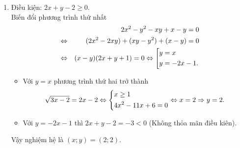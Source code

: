 \begin{ex}
{\begin{enumerate}[1)]
\begin{enumerate}[a)]
\item Xét hai trường hợp
\begin{itemize}
\item Chỉ có đúng một nghiệm lớn hơn 2. Nghĩa là
$$(x_1-2)(x_2-2)<0 \Leftrightarrow x_1x_2-2(x_1+x_2)+4<0 \Leftrightarrow 1<0\quad \text{(Vô lý)}.$$
\item Cả hai nghiệm đều lớn hơn 2. Nghĩa là
$$\heva{& (x_1-2)(x_2-2)>0\\ & x_1+x_2>4} \Leftrightarrow \heva{& 1>0\\ & m+1>4} \Leftrightarrow m>3.$$
\end{itemize}
\end{enumerate}
\item Điều kiện: $2x+y-2\geq 0$.\\
Biến đổi phương trình thứ nhất
\begin{eqnarray*}
&& 2x^2-y^2-xy+x-y=0\\
& \Leftrightarrow & (2x^2-2xy)+(xy-y^2)+(x-y)=0\\
& \Leftrightarrow & (x-y)(2x+y+1)=0\Leftrightarrow \left[\begin{aligned}& y=x\\ & y=-2x-1.\end{aligned}\right.
\end{eqnarray*}
\begin{itemize}
\item Với $y=x$ phương trình thứ hai trở thành
$$\sqrt{3x-2}=2x-2 \Leftrightarrow \left\{\begin{aligned}& x\ge 1\\ & 4x^2-11x+6=0\end{aligned}\right.\Leftrightarrow x=2\Rightarrow y=2.$$
\item Với $y=-2x-1$ thì $2x+y-2=-3<0$ (Không thỏa mãn điều kiên).
\end{itemize}
Vậy nghiệm hệ là $(x;y)=(2;2)$.
\end{enumerate}
}
\end{ex}

